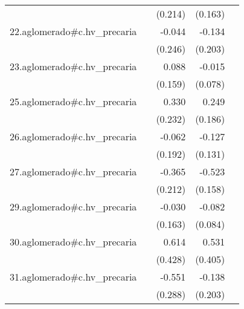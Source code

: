 {\begin{longtable}{l*{4}{D{.}{.}{-1}}}
            &                     &     (0.214)         &     (0.163)         &                     \\
\addlinespace
22.aglomerado#c.hv\_precaria&                     &      -0.044         &      -0.134         &                     \\
            &                     &     (0.246)         &     (0.203)         &                     \\
\addlinespace
23.aglomerado#c.hv\_precaria&                     &       0.088         &      -0.015         &                     \\
            &                     &     (0.159)         &     (0.078)         &                     \\
\addlinespace
25.aglomerado#c.hv\_precaria&                     &       0.330         &       0.249         &                     \\
            &                     &     (0.232)         &     (0.186)         &                     \\
\addlinespace
26.aglomerado#c.hv\_precaria&                     &      -0.062         &      -0.127         &                     \\
            &                     &     (0.192)         &     (0.131)         &                     \\
\addlinespace
27.aglomerado#c.hv\_precaria&                     &      -0.365         &      -0.523\sym{***}&                     \\
            &                     &     (0.212)         &     (0.158)         &                     \\
\addlinespace
29.aglomerado#c.hv\_precaria&                     &      -0.030         &      -0.082         &                     \\
            &                     &     (0.163)         &     (0.084)         &                     \\
\addlinespace
30.aglomerado#c.hv\_precaria&                     &       0.614         &       0.531         &                     \\
            &                     &     (0.428)         &     (0.405)         &                     \\
\addlinespace
31.aglomerado#c.hv\_precaria&                     &      -0.551         &      -0.138         &                     \\
            &                     &     (0.288)         &     (0.203)         &                     \\

\end{longtable}}
